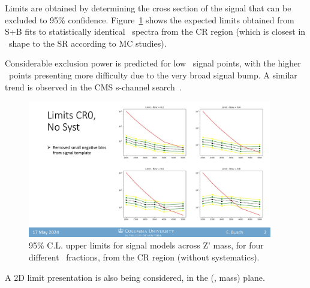 Limits are obtained by determining the cross section of the signal that can be excluded to 95\% confidence. 
Figure~\ref{fig:limits_exp_1D} shows the expected limits obtained from S+B fits to statistically identical \mt~spectra from the CR region (which is closest in \mt~shape to the SR according to MC studies). 

Considerable exclusion power is predicted for low \rinv~signal points, with the higher \rinv~points presenting more difficulty due to the very broad signal bump. 
A similar trend is observed in the CMS s-channel search~\cite{cms_schan}.

\begin{figure}[!htbp]
\centering
   \includegraphics[width=0.95\textwidth]{figures/stats/limits_exp_1D}
    \caption{95\% C.L. upper limits for signal models across Z' mass, for four different \rinv~fractions, from the CR region (without systematics).
    \label{fig:limits_exp_1D}}
\end{figure}


A 2D limit presentation is also being considered, in the (\rinv, mass) plane.


\clearpage


